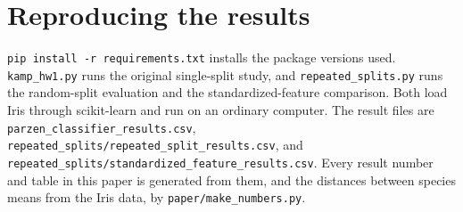 \section*{Reproducing the results}

\texttt{pip install -r requirements.txt} installs the package versions used. \texttt{kamp\_hw1.py} runs the original single-split study, and \texttt{repeated\_splits.py} runs the random-split evaluation and the standardized-feature comparison. Both load Iris through scikit-learn and run on an ordinary computer. The result files are \texttt{parzen\_classifier\_results.csv}, \texttt{repeated\_splits/\allowbreak repeated\_split\_\allowbreak results.csv}, and \texttt{repeated\_splits/\allowbreak standardized\_\allowbreak feature\_results.csv}. Every result number and table in this paper is generated from them, and the distances between species means from the Iris data, by \texttt{paper/make\_numbers.py}.

